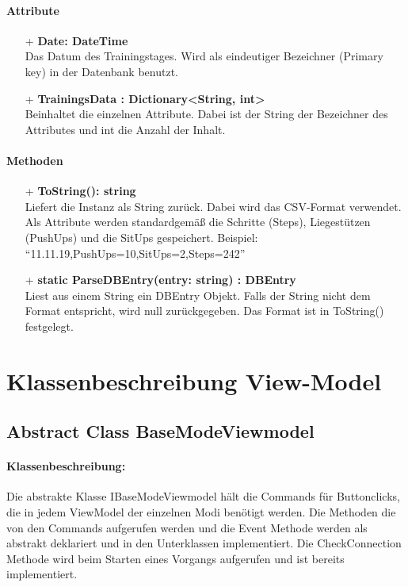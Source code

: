 \documentclass[a4paper,12pt]{article}
\begin{document}
	\paragraph{Attribute}
	\begin{itemize}
		\item[+] \textbf{Date: DateTime}\\Das Datum des Trainingstages. Wird als eindeutiger Bezeichner (Primary key) in der \Gls{Datenbank} benutzt.\\
			\item[+] \textbf{TrainingsData : Dictionary<String, int>}\\ Beinhaltet die einzelnen Attribute. Dabei ist der String der Bezeichner des Attributes und int die Anzahl der Inhalt. 
	\end{itemize}
	 
	 \paragraph{Methoden}
	 \begin{itemize}
	 	\item[+] \textbf{ToString(): string}\\Liefert die Instanz als String zurück. Dabei wird das \gls{CSV}-Format verwendet. Als Attribute werden standardgemäß die Schritte (Steps), Liegestützen (PushUps) und die SitUps gespeichert.
	 	Beispiel: ``11.11.19,PushUps=10,SitUps=2,Steps=242''\\
	 	\item[+] \textbf{static ParseDBEntry(entry: string) : DBEntry}\\Liest aus einem String ein DBEntry Objekt. Falls der String nicht dem Format entspricht, wird null zurückgegeben. Das Format ist in ToString() festgelegt.\\
	\end{itemize}











\section{Klassenbeschreibung View-Model}
\subsection{Abstract Class BaseModeViewmodel} 
\paragraph{Klassenbeschreibung:}
Die abstrakte Klasse IBaseModeViewmodel hält die Commands für Buttonclicks, die in jedem ViewModel der einzelnen Modi benötigt werden. Die Methoden die von den Commands aufgerufen werden und die Event Methode werden als abstrakt deklariert und in den Unterklassen implementiert. Die CheckConnection Methode wird beim Starten eines Vorgangs aufgerufen und ist bereits implementiert.
\end{document}
